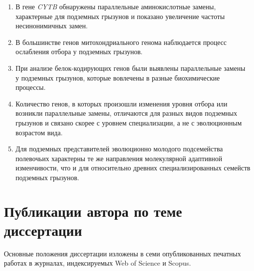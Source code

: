 \begin{enumerate}
	
\item В гене \textit{CYTB} обнаружены параллельные аминокислотные замены, характерные для подземных грызунов и показано увеличение частоты несинонимичных замен.

\item В большинстве генов митохондриального генома наблюдается процесс ослабления отбора у подземных грызунов. 
 
\item При анализе белок-кодирующих генов были выявлены параллельные замены у подземных грызунов, которые вовлечены в разные биохимические процессы. 

\item Количество генов, в которых произошли изменения уровня отбора или возникли параллельные замены, отличаются для разных видов подземных грызунов и связано скорее с уровнем специализации, а не с эволюционным возрастом вида. 

\item Для подземных представителей эволюционно молодого подсемейства полевочьих характерны те же направления молекулярной адаптивной изменчивости, что и для относительно древних специализированных семейств подземных грызунов.
 

\end{enumerate}


\chapter{Публикации автора по теме диссертации}

Основные положения диссертации изложены в семи опубликованных печатных работах в журналах, индексируемых Web of Science и Scopus.

